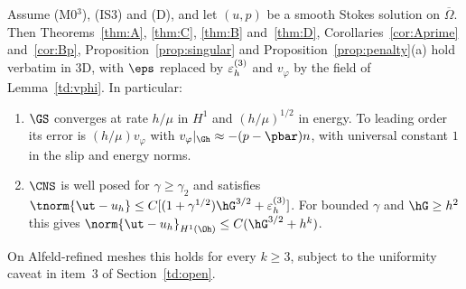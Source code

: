 \begin{theorem}\label{td:main}
Assume (M0$^3$), (IS3) and (D), and let $(u,p)$ be a smooth Stokes solution on $\overline\Omega$. Then Theorems~\ref{thm:A}, \ref{thm:C}, \ref{thm:B} and~\ref{thm:D}, Corollaries~\ref{cor:Aprime} and~\ref{cor:Bp}, Proposition~\ref{prop:singular} and Proposition~\ref{prop:penalty}(a) hold verbatim in 3D, with $\eps$ replaced by $\varepsilon_h^{(3)}$ and $v_\varphi$ by the field of Lemma~\ref{td:vphi}. In particular:
\begin{enumerate}[label=(\roman*)]
\item $\GS$ converges at rate $h/\mu$ in $H^1$ and $(h/\mu)^{1/2}$ in energy. To leading order its error is $(h/\mu)v_\varphi$ with $v_\varphi|_{\Gh}\approx-(p-\pbar)n$, with universal constant $1$ in the slip and energy norms.
\item $\CNS$ is well posed for $\gamma\ge\gamma_2$ and satisfies $\tnorm{\ut-u_h}\le C[(1+\gamma^{1/2})\hG^{3/2}+\epsd]$. For bounded $\gamma$ and $\hG\ge h^2$ this gives $\norm{\ut-u_h}_{H^1(\Oh)}\le C(\hG^{3/2}+h^k)$.
\end{enumerate}
On Alfeld-refined meshes this holds for every $k\ge3$, subject to the uniformity caveat in item~3 of Section~\ref{td:open}.
\end{theorem}

